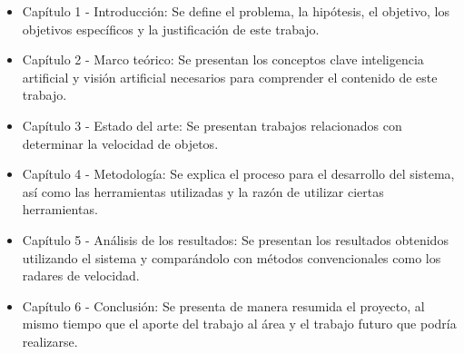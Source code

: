 \begin{itemize}
\item Capítulo 1 - Introducción: Se define el problema, la hipótesis, el objetivo, los objetivos específicos y la justificación de este trabajo.

\item Capítulo 2 - Marco teórico: Se presentan los conceptos clave inteligencia artificial y visión artificial necesarios para comprender el contenido de este trabajo.

\item Capítulo 3 - Estado del arte: Se presentan trabajos relacionados con determinar la velocidad de objetos.

\item Capítulo 4 - Metodología: Se explica el proceso para el desarrollo del sistema, así como las herramientas utilizadas y la razón de utilizar ciertas herramientas.

\item Capítulo 5 - Análisis de los resultados: Se presentan los resultados obtenidos utilizando el sistema y comparándolo con métodos convencionales como los radares de velocidad.

\item Capítulo 6 - Conclusión: Se presenta de manera resumida el proyecto, al mismo tiempo que el aporte del trabajo al área y el trabajo futuro que podría realizarse.
\end{itemize}

